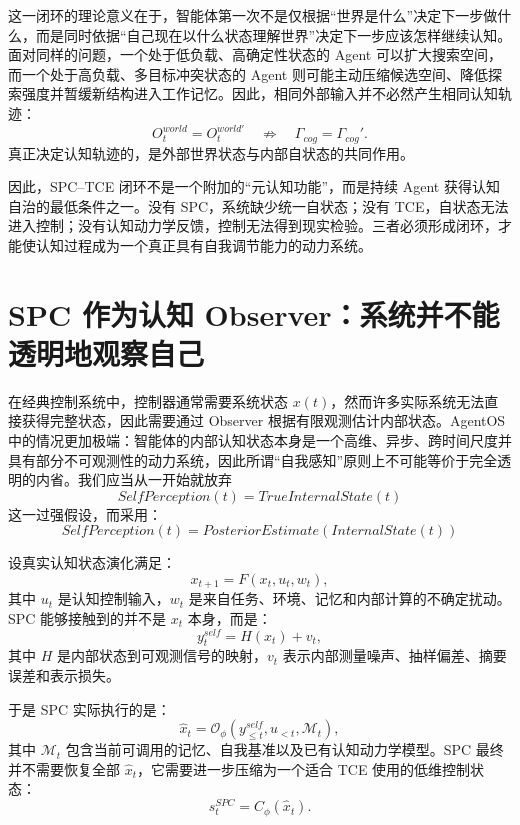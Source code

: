 这一闭环的理论意义在于，智能体第一次不是仅根据``世界是什么''决定下一步做什么，而是同时依据``自己现在以什么状态理解世界''决定下一步应该怎样继续认知。面对同样的问题，一个处于低负载、高确定性状态的 Agent 可以扩大搜索空间，而一个处于高负载、多目标冲突状态的 Agent 则可能主动压缩候选空间、降低探索强度并暂缓新结构进入工作记忆。因此，相同外部输入并不必然产生相同认知轨迹：
\begin{equation}
O_t^{world}=O_t^{world'}
\quad\nRightarrow\quad
\Gamma_{cog}=\Gamma_{cog}'.
\end{equation}
真正决定认知轨迹的，是外部世界状态与内部自状态的共同作用。

因此，SPC--TCE 闭环不是一个附加的``元认知功能''，而是持续 Agent 获得认知自治的最低条件之一。没有 SPC，系统缺少统一自状态；没有 TCE，自状态无法进入控制；没有认知动力学反馈，控制无法得到现实检验。三者必须形成闭环，才能使认知过程成为一个真正具有自我调节能力的动力系统。

\section{SPC 作为认知 Observer：系统并不能透明地观察自己}

在经典控制系统中，控制器通常需要系统状态 $x(t)$，然而许多实际系统无法直接获得完整状态，因此需要通过 Observer 根据有限观测估计内部状态。AgentOS 中的情况更加极端：智能体的内部认知状态本身是一个高维、异步、跨时间尺度并具有部分不可观测性的动力系统，因此所谓``自我感知''原则上不可能等价于完全透明的内省。我们应当从一开始就放弃
\begin{equation}
SelfPerception(t)
=
TrueInternalState(t)
\end{equation}
这一过强假设，而采用：
\begin{equation}
\boxed{
SelfPerception(t)
=
PosteriorEstimate
\left(
InternalState(t)
\right)
}
\end{equation}

设真实认知状态演化满足：
\begin{equation}
x_{t+1}
=
F
\left(
x_t,
u_t,
w_t
\right),
\label{eq:cognitive-plant}
\end{equation}
其中 $u_t$ 是认知控制输入，$w_t$ 是来自任务、环境、记忆和内部计算的不确定扰动。SPC 能够接触到的并不是 $x_t$ 本身，而是：
\begin{equation}
y_t^{self}
=
H(x_t)+v_t,
\label{eq:self-observation}
\end{equation}
其中 $H$ 是内部状态到可观测信号的映射，$v_t$ 表示内部测量噪声、抽样偏差、摘要误差和表示损失。

于是 SPC 实际执行的是：
\begin{equation}
\hat{x}_t
=
\mathcal{O}_{\phi}
\left(
y_{\leq t}^{self},
u_{<t},
\mathcal{M}_t
\right),
\label{eq:observer}
\end{equation}
其中 $\mathcal{M}_t$ 包含当前可调用的记忆、自我基准以及已有认知动力学模型。SPC 最终并不需要恢复全部 $\hat{x}_t$，它需要进一步压缩为一个适合 TCE 使用的低维控制状态：
\begin{equation}
s_t^{SPC}
=
C_{\phi}
\left(
\hat{x}_t
\right).
\label{eq:spc-compression}
\end{equation}

